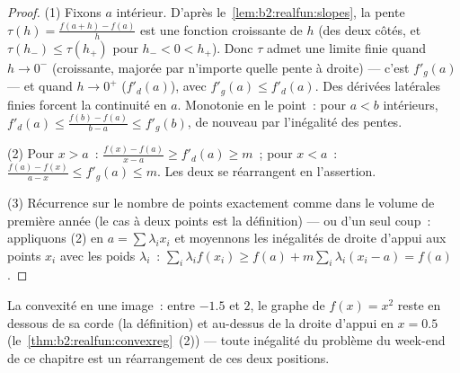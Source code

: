 \begin{proof}
(1) Fixons $a$ intérieur. D'après le~\cref{lem:b2:realfun:slopes}, la
pente $\tau(h) = \frac{f(a + h) - f(a)}{h}$ est une fonction
croissante de $h$ (des deux côtés, et $\tau(h_-) \leq \tau(h_+)$ pour
$h_- < 0 < h_+$). Donc $\tau$ admet une limite finie quand $h \to
0^-$ (croissante, majorée par n'importe quelle pente à droite) ---
c'est $f'_g(a)$ --- et quand $h \to 0^+$ ($f'_d(a)$), avec $f'_g(a)
\leq f'_d(a)$. Des dérivées latérales finies forcent la continuité en
$a$. Monotonie en le point~: pour $a < b$ intérieurs, $f'_d(a) \leq
\frac{f(b) - f(a)}{b - a} \leq f'_g(b)$, de nouveau par l'inégalité
des pentes.

(2) Pour $x > a$~: $\frac{f(x) - f(a)}{x - a} \geq f'_d(a) \geq m$~;
pour $x < a$~: $\frac{f(a) - f(x)}{a - x} \leq f'_g(a) \leq m$. Les
deux se réarrangent en l'assertion.

(3) Récurrence sur le nombre de points exactement comme dans le
volume de première année (le cas à deux points est la définition) ---
ou d'un seul coup~: appliquons (2) en $a = \sum\lambda_i x_i$ et
moyennons les inégalités de droite d'appui aux points $x_i$ avec les
poids $\lambda_i$~: $\sum_i \lambda_i f(x_i) \geq f(a) +
m\sum_i\lambda_i(x_i - a) = f(a)$.
\end{proof}

\begin{omfigure}

{\small La convexité en une image~: entre $-1.5$ et $2$, le graphe
de $f(x) = x^2$ reste en dessous de sa corde (la définition) et
au-dessus de la droite d'appui en $x = 0.5$
(le~\cref{thm:b2:realfun:convexreg}~(2)) --- toute inégalité du
problème du week-end de ce chapitre est un réarrangement de ces deux
positions.}
\end{omfigure}

